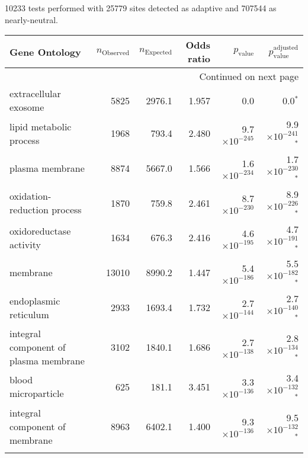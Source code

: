 10233 tests performed with 25779 sites detected as adaptive and 707544 as nearly-neutral.
\scriptsize
\begin{longtable}{|l|r|r|r|r|r|}
\toprule
                                     Gene Ontology & $n_{\mathrm{Observed}}$ & $n_{\mathrm{Expected}}$ & Odds ratio &      $p_{\mathrm{value}}$ &       $p_{\mathrm{value}}^{\mathrm{adjusted}}$ \\
\midrule
\endhead
\midrule
\multicolumn{6}{r}{{Continued on next page}} \\
\midrule
\endfoot

\bottomrule
\endlastfoot
                             extracellular exosome &                    5825 &                  2976.1 &      1.957 &                   0.0 &                    0.0$\bm{^*}$ \\
                           lipid metabolic process &                    1968 &                   793.4 &      2.480 & 9.7$\times 10^{-245}$ &  9.9$\times 10^{-241}$$\bm{^*}$ \\
                                   plasma membrane &                    8874 &                  5667.0 &      1.566 & 1.6$\times 10^{-234}$ &  1.7$\times 10^{-230}$$\bm{^*}$ \\
                       oxidation-reduction process &                    1870 &                   759.8 &      2.461 & 8.7$\times 10^{-230}$ &  8.9$\times 10^{-226}$$\bm{^*}$ \\
                           oxidoreductase activity &                    1634 &                   676.3 &      2.416 & 4.6$\times 10^{-195}$ &  4.7$\times 10^{-191}$$\bm{^*}$ \\
                                          membrane &                   13010 &                  8990.2 &      1.447 & 5.4$\times 10^{-186}$ &  5.5$\times 10^{-182}$$\bm{^*}$ \\
                             endoplasmic reticulum &                    2933 &                  1693.4 &      1.732 & 2.7$\times 10^{-144}$ &  2.7$\times 10^{-140}$$\bm{^*}$ \\
             integral component of plasma membrane &                    3102 &                  1840.1 &      1.686 & 2.7$\times 10^{-138}$ &  2.8$\times 10^{-134}$$\bm{^*}$ \\
                               blood microparticle &                     625 &                   181.1 &      3.451 & 3.3$\times 10^{-136}$ &  3.4$\times 10^{-132}$$\bm{^*}$ \\
                    integral component of membrane &                    8963 &                  6402.1 &      1.400 & 9.3$\times 10^{-136}$ &  9.5$\times 10^{-132}$$\bm{^*}$ \\
$$
\end{longtable}
